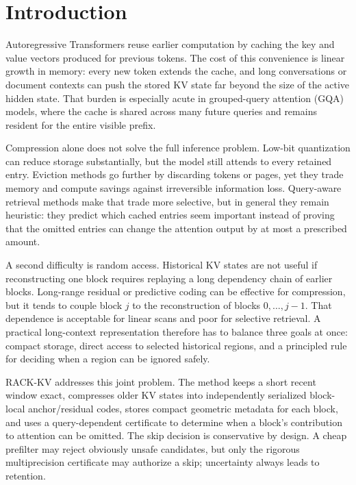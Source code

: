 \section{Introduction}

Autoregressive Transformers reuse earlier computation by caching the key and value vectors produced for previous tokens. The cost of this convenience is linear growth in memory: every new token extends the cache, and long conversations or document contexts can push the stored KV state far beyond the size of the active hidden state. That burden is especially acute in grouped-query attention (GQA) models, where the cache is shared across many future queries and remains resident for the entire visible prefix.

Compression alone does not solve the full inference problem. Low-bit quantization can reduce storage substantially, but the model still attends to every retained entry. Eviction methods go further by discarding tokens or pages, yet they trade memory and compute savings against irreversible information loss. Query-aware retrieval methods make that trade more selective, but in general they remain heuristic: they predict which cached entries seem important instead of proving that the omitted entries can change the attention output by at most a prescribed amount.

A second difficulty is random access. Historical KV states are not useful if reconstructing one block requires replaying a long dependency chain of earlier blocks. Long-range residual or predictive coding can be effective for compression, but it tends to couple block \(j\) to the reconstruction of blocks \(0,\dots,j-1\). That dependence is acceptable for linear scans and poor for selective retrieval. A practical long-context representation therefore has to balance three goals at once: compact storage, direct access to selected historical regions, and a principled rule for deciding when a region can be ignored safely.

RACK-KV addresses this joint problem. The method keeps a short recent window exact, compresses older KV states into independently serialized block-local anchor/residual codes, stores compact geometric metadata for each block, and uses a query-dependent certificate to determine when a block's contribution to attention can be omitted. The skip decision is conservative by design. A cheap \fp{} prefilter may reject obviously unsafe candidates, but only the rigorous multiprecision certificate may authorize a skip; uncertainty always leads to retention.

